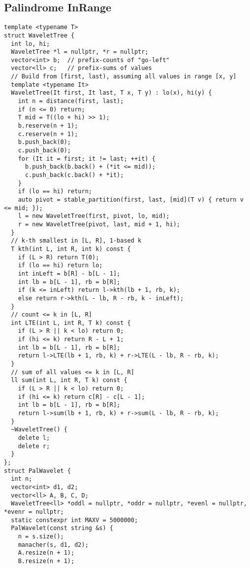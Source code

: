 \documentclass[twoside]{article}
\begin{document}
\begin{multicols*}{2}
{
\subsection*{Palindrome InRange}
}
\begin{verbatim}
template <typename T>
struct WaveletTree {
  int lo, hi;
  WaveletTree *l = nullptr, *r = nullptr;
  vector<int> b;  // prefix-counts of "go-left"
  vector<ll> c;   // prefix-sums of values
  // Build from [first, last), assuming all values in range [x, y]
  template <typename It>
  WaveletTree(It first, It last, T x, T y) : lo(x), hi(y) {
    int n = distance(first, last);
    if (n <= 0) return;
    T mid = T((lo + hi) >> 1);
    b.reserve(n + 1);
    c.reserve(n + 1);
    b.push_back(0);
    c.push_back(0);
    for (It it = first; it != last; ++it) {
      b.push_back(b.back() + (*it <= mid));
      c.push_back(c.back() + *it);
    }
    if (lo == hi) return;
    auto pivot = stable_partition(first, last, [mid](T v) { return v <= mid; });
    l = new WaveletTree(first, pivot, lo, mid);
    r = new WaveletTree(pivot, last, mid + 1, hi);
  }
  // k-th smallest in [L, R], 1-based k
  T kth(int L, int R, int k) const {
    if (L > R) return T(0);
    if (lo == hi) return lo;
    int inLeft = b[R] - b[L - 1];
    int lb = b[L - 1], rb = b[R];
    if (k <= inLeft) return l->kth(lb + 1, rb, k);
    else return r->kth(L - lb, R - rb, k - inLeft);
  }
  // count <= k in [L, R]
  int LTE(int L, int R, T k) const {
    if (L > R || k < lo) return 0;
    if (hi <= k) return R - L + 1;
    int lb = b[L - 1], rb = b[R];
    return l->LTE(lb + 1, rb, k) + r->LTE(L - lb, R - rb, k);
  }
  // sum of all values <= k in [L, R]
  ll sum(int L, int R, T k) const {
    if (L > R || k < lo) return 0;
    if (hi <= k) return c[R] - c[L - 1];
    int lb = b[L - 1], rb = b[R];
    return l->sum(lb + 1, rb, k) + r->sum(L - lb, R - rb, k);
  }
  ~WaveletTree() {
    delete l;
    delete r;
  }
};
struct PalWavelet {
  int n;
  vector<int> d1, d2;
  vector<ll> A, B, C, D;
  WaveletTree<ll> *oddl = nullptr, *oddr = nullptr, *evenl = nullptr, *evenr = nullptr;
  static constexpr int MAXV = 5000000;
  PalWavelet(const string &s) {
    n = s.size();
    manacher(s, d1, d2);
    A.resize(n + 1);
    B.resize(n + 1);

\end{verbatim}
\end{multicols*}
\end{document}
